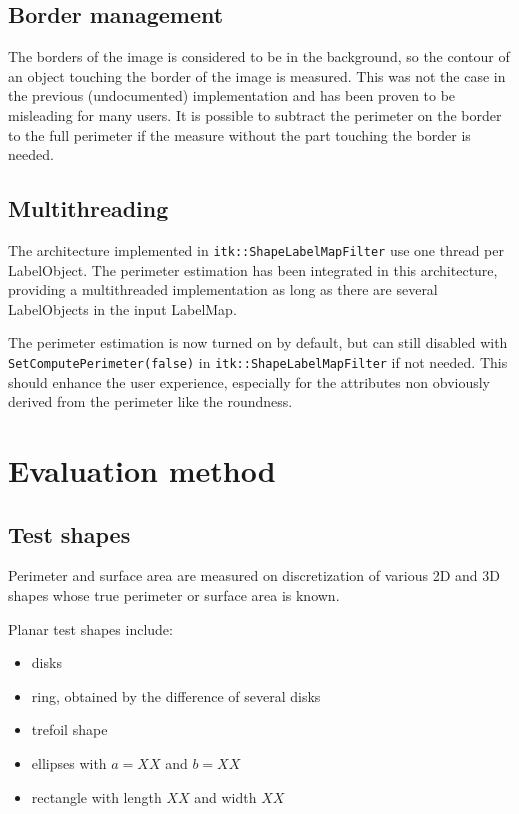 \documentclass{InsightArticle}
\begin{document}
\subsection{Border management}

The borders of the image is considered to be in the background, so the contour of an object touching the border of the image is measured.
This was not the case in the previous (undocumented) implementation and has been proven to be misleading for many users.
It is possible to subtract the perimeter on the border to the full perimeter if the measure without the part touching the border is needed.

\subsection{Multithreading}

The architecture implemented in \verb$itk::ShapeLabelMapFilter$ use one thread per LabelObject. The perimeter estimation has been integrated in this
architecture, providing a multithreaded implementation as long as there are several LabelObjects in the input LabelMap.


The perimeter estimation is now turned on by default, but can still disabled with \verb$SetComputePerimeter(false)$ in
\verb$itk::ShapeLabelMapFilter$ if not needed. This should enhance the user experience, especially for the attributes non obviously derived
from the perimeter like the roundness.


\section{Evaluation method}

\subsection{Test shapes}

Perimeter and surface area are measured on discretization of various 2D and 3D shapes 
whose true perimeter or surface area is known.

Planar test shapes include:
\begin{itemize}
\item disks
\item ring, obtained by the difference of several disks
\item trefoil shape
\item ellipses with $a=XX$ and $b=XX$
\item rectangle with length $XX$ and width $XX$
\end{itemize}
\end{document}
